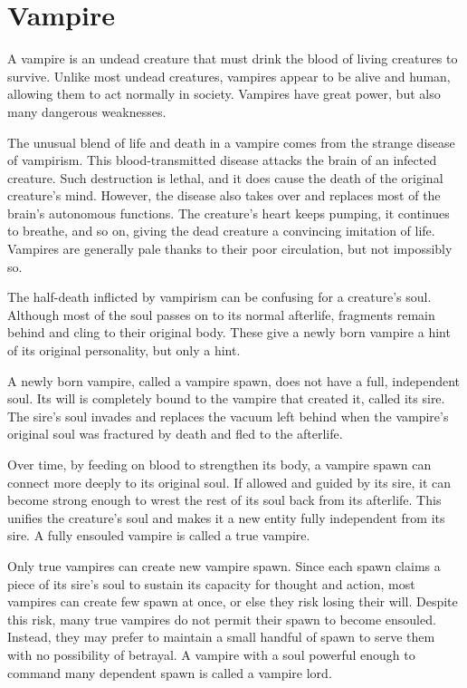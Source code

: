 \section{Vampire}
  A vampire is an undead creature that must drink the blood of living creatures to survive.
  Unlike most undead creatures, vampires appear to be alive and human, allowing them to act normally in society.
  Vampires have great power, but also many dangerous weaknesses.

  The unusual blend of life and death in a vampire comes from the strange disease of vampirism.
  This blood-transmitted disease attacks the brain of an infected creature.
  Such destruction is lethal, and it does cause the death of the original creature's mind.
  However, the disease also takes over and replaces most of the brain's autonomous functions.
  The creature's heart keeps pumping, it continues to breathe, and so on, giving the dead creature a convincing imitation of life.
  Vampires are generally pale thanks to their poor circulation, but not impossibly so.

  The half-death inflicted by vampirism can be confusing for a creature's soul.
  Although most of the soul passes on to its normal afterlife, fragments remain behind and cling to their original body.
  These give a newly born vampire a hint of its original personality, but only a hint.

  A newly born vampire, called a vampire spawn, does not have a full, independent soul.
  Its will is completely bound to the vampire that created it, called its sire.
  The sire's soul invades and replaces the vacuum left behind when the vampire's original soul was fractured by death and fled to the afterlife.

  Over time, by feeding on blood to strengthen its body, a vampire spawn can connect more deeply to its original soul.
  If allowed and guided by its sire, it can become strong enough to wrest the rest of its soul back from its afterlife.
  This unifies the creature's soul and makes it a new entity fully independent from its sire.
  A fully ensouled vampire is called a true vampire.

  Only true vampires can create new vampire spawn.
  Since each spawn claims a piece of its sire's soul to sustain its capacity for thought and action, most vampires can create few spawn at once, or else they risk losing their will.
  Despite this risk, many true vampires do not permit their spawn to become ensouled.
  Instead, they may prefer to maintain a small handful of spawn to serve them with no possibility of betrayal.
  A vampire with a soul powerful enough to command many dependent spawn is called a vampire lord.

